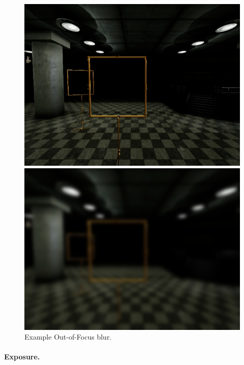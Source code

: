 \begin{figure}[htbp]
	\centering
	\begin{minipage}{0.49\textwidth}
		\includegraphics[width=\textwidth]{fig/gate_example}
	\end{minipage}
	\begin{minipage}{0.49\textwidth}
		\includegraphics[width=\textwidth]{fig/gate_example_focusblur}
	\end{minipage}
	\caption{Example Out-of-Focus blur.}
	\label{fig:focusblur}
\end{figure}

\paragraph{Exposure.}


